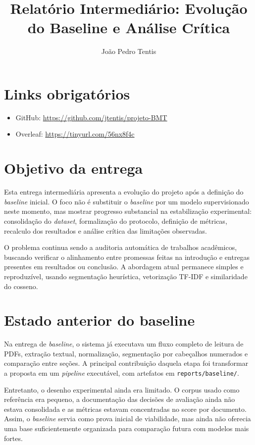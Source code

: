 \documentclass[12pt]{article}
\title{\textbf{Relatório Intermediário: Evolução do Baseline e Análise Crítica}}
\author{João Pedro Tentis\inst{1}}
\begin{document}
\maketitle

\section{Links obrigatórios}

\begin{itemize}
    \item GitHub: \url{https://github.com/jtentis/projeto-BMT}
    \item Overleaf: \url{https://tinyurl.com/56nx8f4c}
\end{itemize}

\section{Objetivo da entrega}

Esta entrega intermediária apresenta a evolução do projeto após a definição do \textit{baseline} inicial. O foco não é substituir o \textit{baseline} por um modelo supervisionado neste momento, mas mostrar progresso substancial na estabilização experimental: consolidação do \textit{dataset}, formalização do protocolo, definição de métricas, recalculo dos resultados e análise crítica das limitações observadas.

O problema continua sendo a auditoria automática de trabalhos acadêmicos, buscando verificar o alinhamento entre promessas feitas na introdução e entregas presentes em resultados ou conclusão. A abordagem atual permanece simples e reproduzível, usando segmentação heurística, vetorização TF-IDF e similaridade do cosseno.

\section{Estado anterior do baseline}

Na entrega de \textit{baseline}, o sistema já executava um fluxo completo de leitura de PDFs, extração textual, normalização, segmentação por cabeçalhos numerados e comparação entre seções. A principal contribuição daquela etapa foi transformar a proposta em um \textit{pipeline} executável, com artefatos em \texttt{reports/baseline/}.

Entretanto, o desenho experimental ainda era limitado. O corpus usado como referência era pequeno, a documentação das decisões de avaliação ainda não estava consolidada e as métricas estavam concentradas no score por documento. Assim, o \textit{baseline} servia como prova inicial de viabilidade, mas ainda não oferecia uma base suficientemente organizada para comparação futura com modelos mais fortes.
\end{document}
